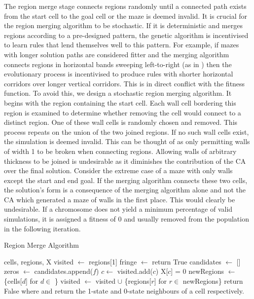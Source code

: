 The region merge stage connects regions randomly until a connected path exists from the start cell to the goal cell or the maze is deemed invalid. It is crucial for the region merging algorithm to be stochastic. If it is deterministic and merges regions according to a pre-designed pattern, the genetic algorithm is incentivised to learn rules that lend themselves well to this pattern. For example, if mazes with longer solution paths are considered fitter and the merging algorithm connects regions in horizontal bands sweeping left-to-right (as in \cite{adams2018evolving}) then the evolutionary process is incentivised to produce rules with shorter horizontal corridors over longer vertical corridors. This is in direct conflict with the fitness function. To avoid this, we design a stochastic region merging algorithm. It begins with the region containing the start cell. Each wall cell bordering this region is examined to determine whether removing the cell would connect to a distinct region. One of these wall cells is randomly chosen and removed. This process repeats on the union of the two joined regions. If no such wall cells exist, the simulation is deemed invalid. This can be thought of as only permitting walls of width 1 to be broken when connecting regions. Allowing walls of arbitrary thickness to be joined is undesirable as it diminishes the contribution of the CA over the final solution. Consider the extreme case of a maze with only walls except the start and end goal. If the merging algorithm connects these two cells, the solution's form is a consequence of the merging algorithm alone and not the CA which generated a maze of walls in the first place. This would clearly be undesirable. If a chromosome does not yield a minimum percentage of valid simulations, it is assigned a fitness of 0 and usually removed from the population in the following iteration.

\begin{algorithm}
  \caption{Region Merge Algorithm}\label{alg:region-merge}
  \begin{algorithmic}
  \Require cells, regions, X
  \State visited $\gets$ regions[1]
    \State fringe $\gets$ 
        \State return True 
    \EndIf
    \State candidates $\gets$ []
        \State zeros $\gets$ 
            \State candidates.append($f$)
        \EndIf
    \EndFor
        \State $c \gets$ 
        \State visited.add($c$)
        \State X[$c$] = 0
        \State newRegions $\gets$ \{cells[$d$] for $d \in$ \}
        \State visited $\gets$ visited $\cup$ \{regions[$r$] for $r \in$ newRegions\}
    \Else
        \State return False 
    \EndIf
  \EndWhile
  \State
  \State where  and  return the 1-state and 0-state neighbours of a cell respectively.
  \end{algorithmic}
\end{algorithm}

